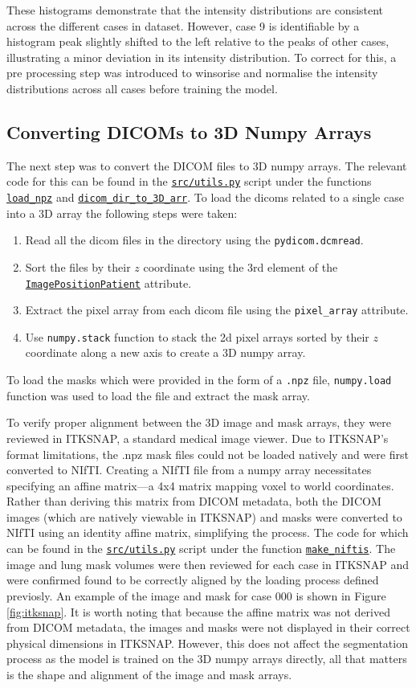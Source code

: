 \documentclass[11pt]{article}
\begin{document}
These histograms demonstrate that the intensity distributions are consistent across the different cases in dataset. However, case 9 is identifiable by a histogram peak slightly shifted to the left relative to the peaks of other cases, illustrating a minor deviation in its intensity distribution. To correct for this, a pre processing step was introduced to winsorise and normalise the intensity distributions across all cases before training the model.

\subsection{Converting DICOMs to 3D Numpy Arrays}
The next step was to convert the DICOM files to 3D numpy arrays. The relevant code for this can be found in the \texttt{\url{src/utils.py}} script under the functions \texttt{\url{load\_npz}} and \texttt{\url{dicom\_dir\_to\_3D\_arr}}. To load the dicoms related to a single case into a 3D array the following steps were taken:
\begin{enumerate}
    \item Read all the dicom files in the directory using the \texttt{pydicom.dcmread}.
    \item Sort the files by their $z$ coordinate using the 3rd element of the \texttt{\url{ImagePositionPatient}} attribute.
    \item Extract the pixel array from each dicom file using the \texttt{pixel\_array} attribute.
    \item Use \texttt{numpy.stack} function to stack the 2d pixel arrays sorted by their $z$ coordinate along a new axis to create a 3D numpy array.
\end{enumerate} To load the masks which were provided in the form of a \texttt{.npz} file, 
\texttt{numpy.load} function was used to load the file and extract the mask array.

To verify proper alignment between the 3D image and mask arrays, they were reviewed in ITKSNAP, a standard medical image viewer. Due to ITKSNAP's format limitations, the .npz mask files could not be loaded natively and were first converted to NIfTI. Creating a NIfTI file from a numpy array necessitates specifying an affine matrix—a 4x4 matrix mapping voxel to world coordinates. Rather than deriving this matrix from DICOM metadata, both the DICOM images (which are natively viewable in ITKSNAP) and masks were converted to NIfTI using an identity affine matrix, simplifying the process. The code for which can be found in the \texttt{\url{src/utils.py}} script under the function \texttt{\url{make_niftis}}. The image and lung mask volumes were then reviewed for each case in ITKSNAP and were confirmed found to be correctly aligned by the loading process defined previosly. An example of the image and mask for case 000 is shown in Figure \ref{fig:itksnap}. It is worth noting that because the affine matrix was not derived from DICOM metadata, the images and masks were not displayed in their correct physical dimensions in ITKSNAP. However, this does not affect the segmentation process as the model is trained on the 3D numpy arrays directly, all that matters is the shape and alignment of the image and mask arrays.
\end{document}
